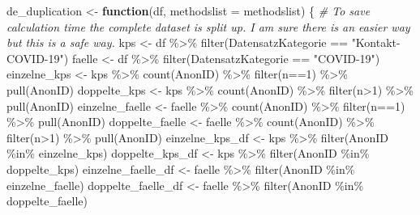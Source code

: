 \documentclass[
]{article}
\newenvironment{Shaded}{\begin{snugshade}}{\end{snugshade}}
\newcommand{\AttributeTok}[1]{\textcolor[rgb]{0.77,0.63,0.00}{#1}}
\newcommand{\CommentTok}[1]{\textcolor[rgb]{0.56,0.35,0.01}{\textit{#1}}}
\newcommand{\ControlFlowTok}[1]{\textcolor[rgb]{0.13,0.29,0.53}{\textbf{#1}}}
\newcommand{\DecValTok}[1]{\textcolor[rgb]{0.00,0.00,0.81}{#1}}
\newcommand{\FunctionTok}[1]{\textcolor[rgb]{0.00,0.00,0.00}{#1}}
\newcommand{\NormalTok}[1]{#1}
\newcommand{\OtherTok}[1]{\textcolor[rgb]{0.56,0.35,0.01}{#1}}
\newcommand{\SpecialCharTok}[1]{\textcolor[rgb]{0.00,0.00,0.00}{#1}}
\newcommand{\StringTok}[1]{\textcolor[rgb]{0.31,0.60,0.02}{#1}}
\begin{document}
\begin{Shaded}
\begin{Highlighting}[]
\NormalTok{de\_duplication }\OtherTok{\textless{}{-}} \ControlFlowTok{function}\NormalTok{(df, }\AttributeTok{methodslist =}\NormalTok{ methodslist) \{}
  \CommentTok{\# To save calculation time the complete dataset is split up. I am sure there is an easier way but this is a safe way.}
\NormalTok{  kps }\OtherTok{\textless{}{-}}\NormalTok{ df }\SpecialCharTok{\%\textgreater{}\%} \FunctionTok{filter}\NormalTok{(DatensatzKategorie }\SpecialCharTok{==} \StringTok{"Kontakt{-}COVID{-}19"}\NormalTok{)}
\NormalTok{  faelle }\OtherTok{\textless{}{-}}\NormalTok{ df }\SpecialCharTok{\%\textgreater{}\%} \FunctionTok{filter}\NormalTok{(DatensatzKategorie }\SpecialCharTok{==} \StringTok{"COVID{-}19"}\NormalTok{)}
\NormalTok{  einzelne\_kps }\OtherTok{\textless{}{-}}\NormalTok{ kps }\SpecialCharTok{\%\textgreater{}\%} \FunctionTok{count}\NormalTok{(AnonID) }\SpecialCharTok{\%\textgreater{}\%} \FunctionTok{filter}\NormalTok{(n}\SpecialCharTok{==}\DecValTok{1}\NormalTok{) }\SpecialCharTok{\%\textgreater{}\%} \FunctionTok{pull}\NormalTok{(AnonID)}
\NormalTok{  doppelte\_kps }\OtherTok{\textless{}{-}}\NormalTok{ kps }\SpecialCharTok{\%\textgreater{}\%} \FunctionTok{count}\NormalTok{(AnonID) }\SpecialCharTok{\%\textgreater{}\%} \FunctionTok{filter}\NormalTok{(n}\SpecialCharTok{\textgreater{}}\DecValTok{1}\NormalTok{) }\SpecialCharTok{\%\textgreater{}\%} \FunctionTok{pull}\NormalTok{(AnonID)}
\NormalTok{  einzelne\_faelle }\OtherTok{\textless{}{-}}\NormalTok{ faelle }\SpecialCharTok{\%\textgreater{}\%} \FunctionTok{count}\NormalTok{(AnonID) }\SpecialCharTok{\%\textgreater{}\%} \FunctionTok{filter}\NormalTok{(n}\SpecialCharTok{==}\DecValTok{1}\NormalTok{) }\SpecialCharTok{\%\textgreater{}\%} \FunctionTok{pull}\NormalTok{(AnonID)}
\NormalTok{  doppelte\_faelle }\OtherTok{\textless{}{-}}\NormalTok{ faelle }\SpecialCharTok{\%\textgreater{}\%} \FunctionTok{count}\NormalTok{(AnonID) }\SpecialCharTok{\%\textgreater{}\%} \FunctionTok{filter}\NormalTok{(n}\SpecialCharTok{\textgreater{}}\DecValTok{1}\NormalTok{) }\SpecialCharTok{\%\textgreater{}\%} \FunctionTok{pull}\NormalTok{(AnonID)}
\NormalTok{  einzelne\_kps\_df }\OtherTok{\textless{}{-}}\NormalTok{ kps }\SpecialCharTok{\%\textgreater{}\%} \FunctionTok{filter}\NormalTok{(AnonID }\SpecialCharTok{\%in\%}\NormalTok{ einzelne\_kps)}
\NormalTok{  doppelte\_kps\_df }\OtherTok{\textless{}{-}}\NormalTok{ kps }\SpecialCharTok{\%\textgreater{}\%} \FunctionTok{filter}\NormalTok{(AnonID }\SpecialCharTok{\%in\%}\NormalTok{ doppelte\_kps)}
\NormalTok{  einzelne\_faelle\_df }\OtherTok{\textless{}{-}}\NormalTok{ faelle }\SpecialCharTok{\%\textgreater{}\%} \FunctionTok{filter}\NormalTok{(AnonID }\SpecialCharTok{\%in\%}\NormalTok{ einzelne\_faelle)}
\NormalTok{  doppelte\_faelle\_df }\OtherTok{\textless{}{-}}\NormalTok{ faelle }\SpecialCharTok{\%\textgreater{}\%} \FunctionTok{filter}\NormalTok{(AnonID }\SpecialCharTok{\%in\%}\NormalTok{ doppelte\_faelle)}
  

\end{Highlighting}
\end{Shaded}
\end{document}
